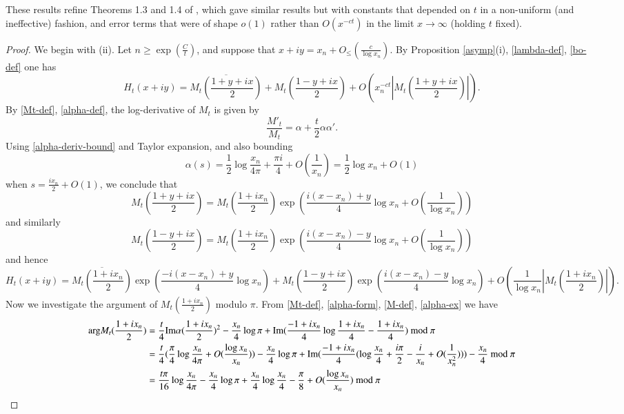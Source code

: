 These results refine Theorems 1.3 and 1.4 of \cite{kkl}, which gave similar results but with constants that depended on $t$ in a non-uniform (and ineffective) fashion, and error terms that were of shape $o(1)$ rather than $O(x^{-ct})$ in the limit $x \to \infty$ (holding $t$ fixed).

\begin{proof}  We begin with (ii).  Let $n \geq \exp( \frac{C}{t})$, and suppose that $x+iy = x_n + O_{\leq}(\frac{c}{\log x_n})$.  
By Proposition \ref{asymp}(i), \eqref{lambda-def}, \eqref{bo-def} one has
$$ H_t(x+iy) = \overline{M_t(\frac{1+y+ix}{2})} + M_t(\frac{1-y+ix}{2}) + O( x_n^{-ct} |M_t(\frac{1+y+ix}{2})| ).$$
By \eqref{Mt-def}, \eqref{alpha-def}, the log-derivative of $M_t$ is given by
\begin{equation}\label{mt-deriv}
 \frac{M'_t}{M_t} = \alpha + \frac{t}{2} \alpha \alpha'.
\end{equation}
Using \eqref{alpha-deriv-bound} and Taylor expansion, and also bounding 
\begin{equation}\label{alpha-ex}
\alpha(s) = \frac{1}{2} \log \frac{x_n}{4\pi} + \frac{\pi i}{4} + O( \frac{1}{x_n}) = \frac{1}{2} \log x_n + O(1)
\end{equation}
when $s = \frac{ix_n}{2} + O(1)$, we conclude that
$$ M_t(\frac{1+y+ix}{2}) = M_t(\frac{1+ix_n}{2}) \exp( \frac{i(x-x_n) + y}{4} \log x_n + O( \frac{1}{\log x_n} ) )$$
and similarly
$$ M_t(\frac{1-y+ix}{2}) = M_t(\frac{1+ix_n}{2}) \exp( \frac{i(x-x_n) - y}{4} \log x_n + O( \frac{1}{\log x_n} ) )$$
and hence
$$ H_t(x+iy) = \overline{M_t(\frac{1+ix_n}{2})} \exp( \frac{-i(x-x_n) + y}{4} \log x_n)  
+ M_t(\frac{1-y+ix}{2}) \exp( \frac{i(x-x_n) - y}{4} \log x_n) + O( \frac{1}{\log x_n} |M_t(\frac{1+ix_n}{2})| ).$$
Now we investigate the argument of $M_t(\frac{1+ix_n}{2})$ modulo $\pi$.
From \eqref{Mt-def}, \eqref{alpha-form}, \eqref{M-def}, \eqref{alpha-ex} we have
\begin{align*}
\mathrm{arg} M_t(\frac{1+ix_n}{2}) &= \frac{t}{4} \mathrm{Im} \alpha(\frac{1+ix_n}{2})^2 - \frac{x_n}{4} \log \pi + \mathrm{Im}( \frac{-1+ix_n}{4} \log \frac{1+ix_n}{4} - \frac{1+ix_n}{4}) \hbox{ mod } \pi \\
&= \frac{t}{4} (\frac{\pi}{4} \log \frac{x_n}{4\pi} + O(\frac{\log x_n}{x_n})) - \frac{x_n}{4} \log \pi 
+ \mathrm{Im}( \frac{-1+ix_n}{4} (\log \frac{x_n}{4} + \frac{i\pi}{2} - \frac{i}{x_n} + O(\frac{1}{x_n^2}) ) ) - \frac{x_n}{4} \hbox{ mod } \pi \\
&= \frac{t \pi}{16} \log \frac{x_n}{4\pi} - \frac{x_n}{4} \log \pi 
+ \frac{x_n}{4} \log \frac{x_n}{4} - \frac{\pi}{8} + O( \frac{\log x_n}{x_n} ) \hbox{ mod } \pi \\

\end{align*}
\end{proof}
